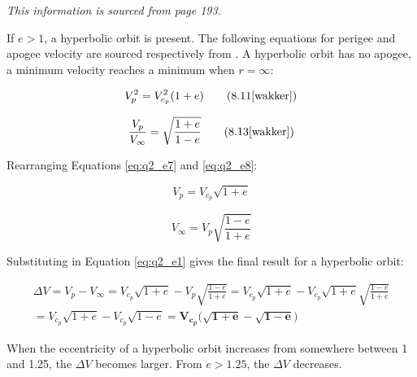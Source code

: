 \noindent \textit{This information is sourced from \cite{wakker} page 193.}

\bigskip

\noindent If $e > 1$, a hyperbolic orbit is present. The following equations for perigee and apogee velocity are sourced respectively from \cite{wakker}. A hyperbolic orbit has no apogee, a minimum velocity reaches a minimum when $r = \infty$:

\begin{equation}
    V_{p}^2 = V_{c_{p}}^2 (1 + e)
    \tag{8.11\cite{wakker}}
    \label{eq:q2_e7}
\end{equation}

\begin{equation}
    \frac{V_{p}}{V_{\infty}} = \sqrt{\frac{1 + e}{1 - e}}
    \tag{8.13\cite{wakker}}
    \label{eq:q2_e8}
\end{equation}

\noindent Rearranging Equations \ref{eq:q2_e7} and \ref{eq:q2_e8}:

\begin{equation}
    V_{p} = V_{c_{p}} \sqrt{1 + e}
    \label{eq:q2_e9}
\end{equation}

\begin{equation}
    V_{\infty} = V_{p} \sqrt{\frac{1 - e}{1 + e}}
    \label{eq:q2_e10}
\end{equation}

\noindent Substituting in Equation \ref{eq:q2_e1} gives the final result for a hyperbolic orbit:

\begin{multline}
    \Delta V = V_{p} - V_{\infty} = V_{c_{p}} \sqrt{1 + e} - V_{p} \sqrt{\frac{1 - e}{1 + e}}
    = V_{c_{p}} \sqrt{1 + e} - V_{c_{p}} \sqrt{1 + e} \sqrt{\frac{1 - e}{1 + e}} \\
    = V_{c_{p}} \sqrt{1 + e} - V_{c_{p}} \sqrt{1 - e}
    = \boldsymbol{V_{c_{p}} \bigg( \sqrt{1 + e} - \sqrt{1 - e} \bigg)}
    \label{eq:q2_final}
\end{multline}

\noindent When the eccentricity of a hyperbolic orbit increases from somewhere between 1 and 1.25, the $\Delta V$ becomes larger. From $e > 1.25$, the $\Delta V$ decreases.